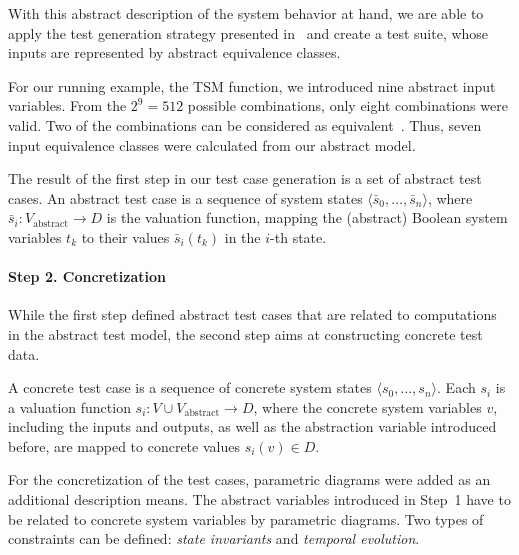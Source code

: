 With this abstract description of the system behavior at hand, we are able to
apply the test generation strategy 
presented in~\cite{huang_complete_2014} and create a test suite,
whose inputs are represented by abstract equivalence classes.

\begin{example}
For our running example, the TSM function, we introduced nine abstract input variables. 
From the $2^9=512$ possible combinations, only eight combinations were valid. Two of the combinations
can be considered as equivalent~\cite{huang_complete_2014}. Thus, seven input equivalence classes
were calculated from our abstract model.
\end{example} 

The result of the first step in our test case generation is a set of
abstract test cases. An abstract test case is a sequence of system states
$\langle\bar{s}_0,\ldots,\bar{s}_n\rangle$, where $\bar{s}_i: V_\text{abstract} \rightarrow D$ is the
valuation function, mapping the (abstract) Boolean system variables $t_k$
 to their values $\bar{s}_i(t_k)$    in the
$i$-th state.

\paragraph{Step 2. Concretization}\label{sec:concretization}

While the first step defined abstract test cases that are related to
computations in the abstract test model, the second step
aims at constructing concrete test data.

A concrete test case is a sequence of concrete 
system states $\langle s_0,\ldots,s_n\rangle$. Each $s_i$ is a valuation function   
$s_i: V\cup  V_\text{abstract} \rightarrow D$,
where the concrete system variables $v$, including the inputs and outputs, as well as the 
abstraction variable introduced before, are mapped
to concrete values  $s_i(v)\in D$.

For the concretization of the test cases, parametric diagrams were
added as an additional description means. The 
abstract variables introduced in Step~1 have to be related to concrete system
variables by parametric diagrams.
Two types of constraints can be
defined: \emph{state invariants} and \emph{temporal evolution}.

